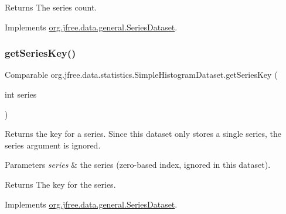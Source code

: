\begin{DoxyReturn}{Returns}
The series count. 
\end{DoxyReturn}


Implements \mbox{\hyperlink{interfaceorg_1_1jfree_1_1data_1_1general_1_1_series_dataset_a84fe822f5918f941d9de1ed1b73c9f58}{org.\+jfree.\+data.\+general.\+Series\+Dataset}}.

\mbox{\label{classorg_1_1jfree_1_1data_1_1statistics_1_1_simple_histogram_dataset_a62448090b52d9426a4c770c5471f41df}} 
\subsubsection{\texorpdfstring{get\+Series\+Key()}{getSeriesKey()}}
{\footnotesize\ttfamily Comparable org.\+jfree.\+data.\+statistics.\+Simple\+Histogram\+Dataset.\+get\+Series\+Key (\begin{DoxyParamCaption}\item[{int}]{series }\end{DoxyParamCaption})}

Returns the key for a series. Since this dataset only stores a single series, the {\ttfamily series} argument is ignored.


\begin{DoxyParams}{Parameters}
{\em series} & the series (zero-\/based index, ignored in this dataset).\\
\hline
\end{DoxyParams}
\begin{DoxyReturn}{Returns}
The key for the series. 
\end{DoxyReturn}


Implements \mbox{\hyperlink{interfaceorg_1_1jfree_1_1data_1_1general_1_1_series_dataset_a60488892b2314a05a012999e26a74178}{org.\+jfree.\+data.\+general.\+Series\+Dataset}}.

\mbox{\label{classorg_1_1jfree_1_1data_1_1statistics_1_1_simple_histogram_dataset_a9db41ff665f21bedc22f0e5514dd52d8}} 
